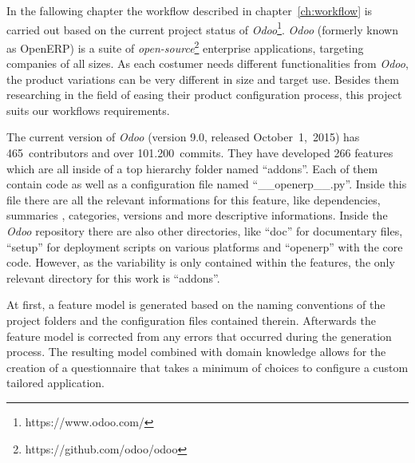 In the fallowing chapter the workflow described in chapter~\ref{ch:workflow} is carried out based on the current project status of \textit{Odoo}\footnote{https://www.odoo.com/}. \textit{Odoo} (formerly known as OpenERP) is a suite of \textit{open-source}\footnote{https://github.com/odoo/odoo} enterprise applications, targeting companies of all sizes. As each costumer needs different functionalities from \textit{Odoo}, the product variations can be very different in size and target use. Besides them researching in the field of easing their product configuration process, this project suits our workflows requirements.

The current version of \textit{Odoo} (version 9.0, released \mbox{October 1, 2015)} has 465~contributors and over 101.200~commits. They have developed 266 features which are all inside of a top hierarchy folder named ``addons''. Each of them contain code as well as a configuration file named ``\_\_openerp\_\_.py''. Inside this file there are all the relevant informations for this feature, like dependencies, summaries , categories, versions and more descriptive informations. Inside the \textit{Odoo} repository there are also other directories, like ``doc'' for documentary files, ``setup'' for deployment scripts on various platforms and ``openerp'' with the core code. However, as the variability is only contained within the features, the only relevant directory for this work is ``addons''.

At first, a feature model is generated based on the naming conventions of the project folders and the configuration files contained therein. Afterwards the feature model is corrected from any errors that occurred during the generation process. The resulting model combined with domain knowledge allows for the creation of a questionnaire that takes a minimum of choices to configure a custom tailored application.

